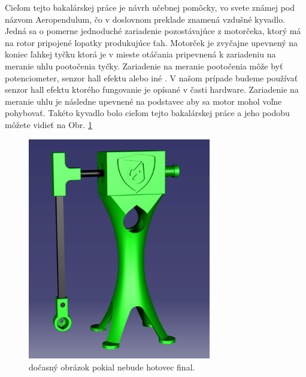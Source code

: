 Cieľom tejto bakalárskej práce je návrh učebnej pomôcky, vo svete známej pod názvom Aeropendulum, čo v doslovnom preklade znamená vzdušné kyvadlo. Jedná sa o pomerne jednoduché zariadenie pozostávajúce z motorčeka, ktorý má na rotor pripojené lopatky produkujúce ťah. Motorček je zvyčajne upevnený na koniec ľahkej tyčku ktorá je v mieste otáčania pripevnená k zariadeniu na meranie uhlu pootočenia tyčky. Zariadenie na meranie pootočenia môže byť potenciometer, senzor hall efektu alebo iné \cite{senzor}. V našom prípade budeme používať senzor hall efektu ktorého fungovanie je opísané v časti hardware. Zariadenie na meranie uhlu je následne upevnené na podstavec aby sa motor mohol voľne pohybovať. Takéto kyvadlo bolo cieľom tejto bakalárskej práce a jeho podobu môžete vidieť na Obr. \ref{OBRAZOK 1.2}


\begin{figure}[!tbh]
\centering
\includegraphics[width=80mm]{obr/pendulum.png}
\caption{dočasný obrázok pokial nebude hotovec final.}\label{OBRAZOK 1.2}
\end{figure}


